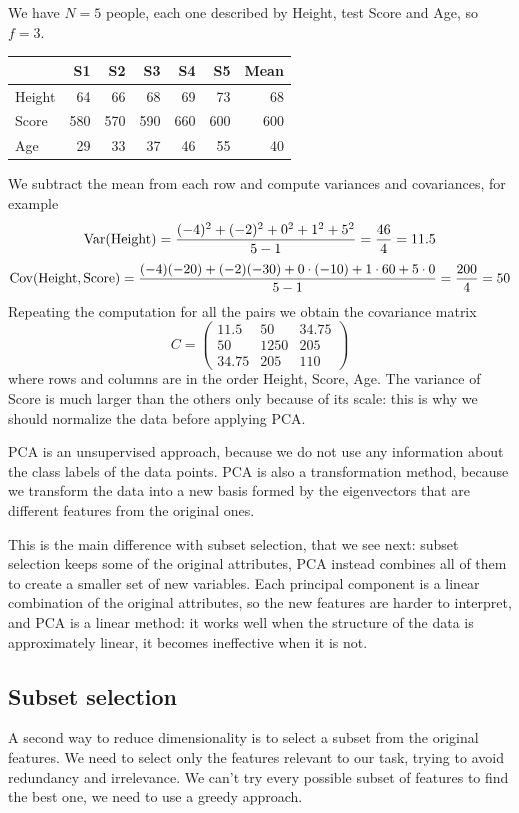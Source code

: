 \begin{example}
We have $N=5$ people, each one described by Height, test Score and Age, so $f=3$.
\begin{center}
\begin{tabular}{lrrrrrr}
\toprule
 & S1 & S2 & S3 & S4 & S5 & Mean \\
\midrule
Height & 64 & 66 & 68 & 69 & 73 & 68 \\
Score & 580 & 570 & 590 & 660 & 600 & 600 \\
Age & 29 & 33 & 37 & 46 & 55 & 40 \\
\bottomrule
\end{tabular}
\end{center}
We subtract the mean from each row and compute variances and covariances, for example
\[
    \operatorname{Var}(\text{Height}) = \frac{(-4)^2+(-2)^2+0^2+1^2+5^2}{5-1} = \frac{46}{4} = 11.5
\]
\[
    \operatorname{Cov}(\text{Height},\text{Score}) = \frac{(-4)(-20)+(-2)(-30)+0\cdot(-10)+1\cdot 60+5\cdot 0}{5-1} = \frac{200}{4} = 50
\]
Repeating the computation for all the pairs we obtain the covariance matrix
\[
    C = \begin{pmatrix}
        11.5 & 50 & 34.75 \\
        50 & 1250 & 205 \\
        34.75 & 205 & 110
    \end{pmatrix}
\]
where rows and columns are in the order Height, Score, Age. The variance of Score is much larger than the others only because of its scale: this is why we should normalize the data before applying PCA.
\end{example}

PCA is an unsupervised approach, because we do not use any information about the class labels of the data points. PCA is also a transformation method, because we transform the data into a new basis formed by the eigenvectors that are different features from the original ones.

This is the main difference with subset selection, that we see next: subset selection keeps some of the original attributes, PCA instead combines all of them to create a smaller set of new variables. Each principal component is a linear combination of the original attributes, so the new features are harder to interpret, and PCA is a linear method: it works well when the structure of the data is approximately linear, it becomes ineffective when it is not.

\subsection{Subset selection}
A second way to reduce dimensionality is to select a subset from the original features. We need to select only the features relevant to our task, trying to avoid redundancy and irrelevance. We can't try every possible subset of features to find the best one, we need to use a greedy approach.

